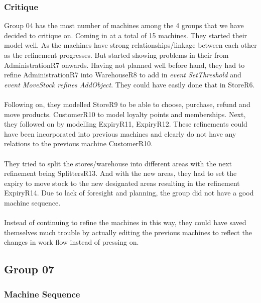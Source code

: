 \subsubsection{Critique}
\label{critique}

Group 04 has the most number of machines among the 4 groups that we have decided to critique on. Coming in at a total of 15 machines. They started their model well. As the machines have strong relationships\slash linkage between each other as the refinement progresses. But started showing problems in their from AdministrationR7 onwards. Having not planned well before hand, they had to refine AdministrationR7 into WarehouseR8 to add in \emph{event SetThreshold} and \emph{event MoveStock refines AddObject}. They could have easily done that in StoreR6.  \\ \\  Following on, they modelled StoreR9 to be able to choose, purchase, refund and move products. CustomerR10 to model loyalty points and memberships. Next, they followed on by modelling ExpiryR11, ExpiryR12. These refinements could have been incorporated into previous machines and clearly do not have any relations to the previous machine CustomerR10.  \\ \\  They tried to split the stores\slash warehouse into different areas with the next refinement being SplittersR13. And with the new areas, they had to set the expiry to move stock to the new designated areas resulting in the refinement ExpiryR14. Due to lack of foresight and planning, the group did not have a good machine sequence.  \\ \\  Instead of continuing to refine the machines in this way, they could have saved themselves much trouble by actually editing the previous machines to reflect the changes in work flow instead of pressing on.

\subsection{Group 07}
\label{group07}

\subsubsection{Machine Sequence}
\label{machinesequence}

